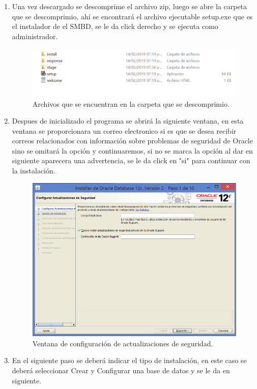 \documentclass[10pt]{article}
\begin{document}
	\begin{enumerate}
		\item Una vez descargado se descomprime el archivo zip, luego se abre  la carpeta que se descomprimio, ahí se encontrará el archivo ejecutable setup.exe que es el instalador de el SMBD, se le da click derecho y se ejecuta como administrador.\\
		
		\begin{figure}[H]
			\centering
			\includegraphics[width=0.6 \textwidth]{img/Imagenes_finales/im_setup}
			\caption{Archivos que se encuentran en la carpeta que se descomprimio.}
		\end{figure}
		
		
		\item Despues de inicializado el programa se abrirá la siguiente ventana, en esta ventana se proporcionara un correo electronico si es que se desea recibir correos relacionados con información sobre problemas de seguridad de Oracle sino se omitará la opción y continuaremos, si no se marca la opción al dar en siguiente aparecera una advertencia, se le da click en "si" para continuar con la instalación.\\  
		
		\begin{figure}[H]
			\centering
		\includegraphics[width=0.6 \textwidth]{img/Imagenes_finales/im_1}
		\caption{Ventana de configuración de actualizaciones de seguridad.}
	    \end{figure}
		
		\item En el siguiente paso se deberá indicar el tipo de instalación, en este caso se deberá seleccionar Crear y Configurar una base de datos y se le da en siguiente.\\
		

\end{enumerate}
\end{document}
